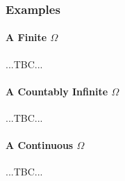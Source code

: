 






\subsubsection{Examples}

\paragraph{A Finite $\Omega$} ...TBC...

\paragraph{A Countably Infinite $\Omega$} ...TBC...

\paragraph{A Continuous $\Omega$} ...TBC...






